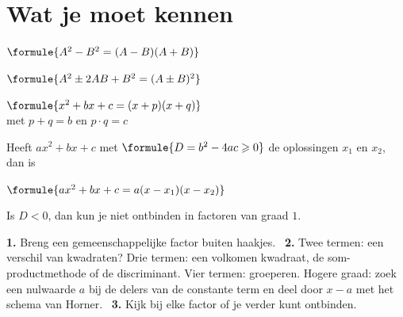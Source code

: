 %



\section{Wat je moet kennen}

\begin{theorie}
\begin{minipage}[t]{.47\linewidth}
\vspace{0pt}
$\formule{A^2 - B^2 = (A - B)(A + B)}$

\vspace{1mm}
$\formule{A^2 \pm 2AB + B^2 = (A \pm B)^2}$

\vspace{1mm}
$\formule{x^2 + bx + c = (x + p)(x + q)}$ \\ \hspace*{6mm} met $p + q = b$ en $p \cdot q = c$
\end{minipage}\hfill
\begin{minipage}[t]{.5\linewidth}
\vspace{0pt}
Heeft $ax^2 + bx + c$ met $\formule{D = b^2 - 4ac \geqslant 0}$ de oplossingen $x_1$ en $x_2$, dan is

\vspace{1mm}
$\formule{ax^2 + bx + c = a(x - x_1)(x - x_2)}$

\vspace{1mm}
Is $D < 0$, dan kun je niet ontbinden in factoren van graad $1$.
\end{minipage}
\end{theorie}

\begin{werkwijze}
\textbf{1.} Breng een gemeenschappelijke factor buiten haakjes. \ \textbf{2.} Twee termen: een verschil van kwadraten? Drie termen: een volkomen kwadraat, de som-productmethode of de discriminant. Vier termen: groeperen. Hogere graad: zoek een nulwaarde $a$ bij de delers van de constante term en deel door $x - a$ met het schema van Horner. \ \textbf{3.} Kijk bij elke factor of je verder kunt ontbinden.
\end{werkwijze}

